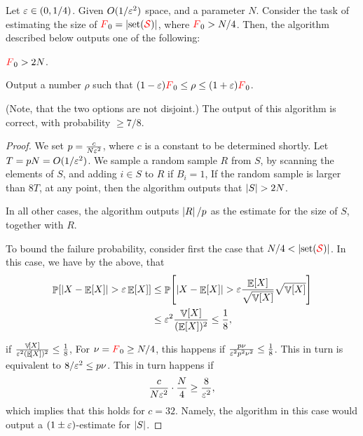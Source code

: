 \begin{lemma}
    Let ${\varepsilon} \in (0,1/4)$.  Given $O(1/{\varepsilon}^2)$ space, and a
    parameter $N$. Consider the task of estimating the size of
    $\Frq_0 = \cardin{\distinctX{\STRM}}$, where ${\textcolor{red}{F}}_0 > N/4$.
    Then, the algorithm described below outputs one of the following:
    \begin{compactenumA}
        \item ${\textcolor{red}{F}}_0 > 2N$.
        \item Output a number $\rho$ such that
        $(1-{\varepsilon}){\textcolor{red}{F}}_0 \leq \rho \leq (1+{\varepsilon}){\textcolor{red}{F}}_0$.
    \end{compactenumA}
    (Note, that the two options are not disjoint.)  The output of this
    algorithm is correct, with probability $\geq 7/8$.
\end{lemma}
\begin{proof}
    We set $p= \frac{c}{N{\varepsilon}^2}$, where $c$ is a constant to be
    determined shortly. Let $T = p N = O(1/{\varepsilon}^2)$. We sample a
    random sample $R$ from $S$, by scanning the elements of $S$, and
    adding $i\in S$ to $R$ if $B_i=1$, If the random sample is larger
    than $8T$, at any point, then the algorithm outputs that
    $\left| {S} \right| > 2N$.

    In all other cases, the algorithm outputs $\left| {R} \right| /p$ as the
    estimate for the size of $S$, together with $R$.


    To bound the failure probability, consider first the case that
    $N/4 < \cardin{\distinctX{\STRM}}$. In this case, we have by the
    above, that
    \begin{align*}
        \Prob{\cardin{X - \Ex{X}} > \eps \Ex{X}}%
        &\leq%
        \Prob{\cardin{X - \Ex{X}} > \eps
           \frac{\Ex{X}}{\sqrt{\Var{X}}}
           \sqrt{\Var{X}}}%
        \\&\leq%
        \eps^2 \frac{\Var{X}}{(\Ex{X})^2}
        \leq \frac{1}{8},
    \end{align*}

    if $\frac{\mathop{\mathbb{V}}\!\left[ {X} \right]}{{\varepsilon}^2 (\mathop{\mathbb{E}}\!\left[ {X} \right])^2} \leq \frac{1}{8}$, For
    $\nu = {\textcolor{red}{F}}_0 \geq N/4$, this happens if
    $\frac{p \nu}{{\varepsilon}^2 p^2 \nu^2} \leq \frac{1}{8}$. This in turn is
    equivalent to $8/{\varepsilon}^2 \leq p \nu $. This in turn happens if
    \begin{equation*}
        \frac{c}{N{\varepsilon}^2} \cdot \frac{N}{4} \geq \frac{8}{{\varepsilon}^2},
    \end{equation*}
    which implies that this holds for $c=32$.  Namely, the algorithm
    in this case would output a $(1\pm{\varepsilon})$-estimate for
    $\left| {S} \right|$.


\end{proof}
